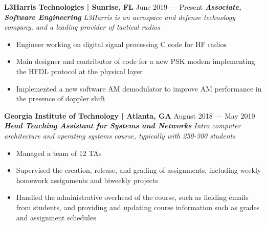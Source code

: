 




\begin{samepage}
\textbf{L3Harris Technologies | Sunrise, FL}
\hfill
June 2019 --- Present
\newline
\textbf{\textit{Associate, Software Engineering}}
\newline
\textit{L3Harris is an aerospace and defense technology company, and a leading provider of tactical radios}
\begin{itemize}[noitemsep,topsep=0pt,parsep=0pt,partopsep=0pt]
    \item Engineer working on digital signal processing C code for HF radios
    \item Main designer and contributor of code for a new PSK modem implementing the HFDL protocol at the physical layer
    \item Implemented a new software AM demodulator to improve AM performance in the presence of doppler shift
\end{itemize}
\end{samepage}
\smallskip

\begin{samepage}
\textbf{Georgia Institute of Technology | Atlanta, GA}
\hfill
August 2018 --- May 2019
\newline
\textbf{\textit{Head Teaching Assistant for Systems and Networks}}
\newline
\textit{Intro computer architecture and operating systems course, typically with 250-300 students}
\begin{itemize}[noitemsep,topsep=0pt,parsep=0pt,partopsep=0pt]
    \item Managed a team of 12 TAs
    \item Supervised the creation, release, and grading of assignments, including weekly homework assignments and biweekly projects
    \item Handled the administrative overhead of the course, such as fielding emails from students, and providing and updating course information such as grades and assignment schedules
\end{itemize}
\end{samepage}
\smallskip

